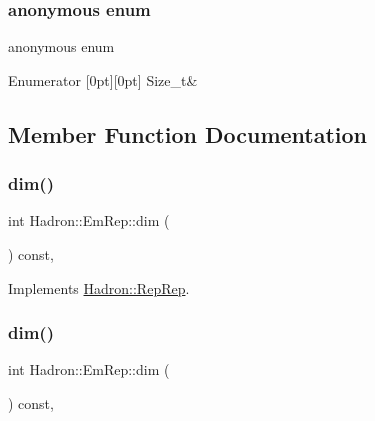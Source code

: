 \subsubsection{\texorpdfstring{anonymous enum}{anonymous enum}}
{\footnotesize\ttfamily anonymous enum}

\begin{DoxyEnumFields}{Enumerator}
[0pt][0pt]{}\mbox{\label{structHadron_1_1EmRep_a22e88e79dedc5fc8a9a51193c073ccfca623644658daf44b84d24cef484208987}} 
Size\+\_\+t&\\
\hline

\end{DoxyEnumFields}


\subsection{Member Function Documentation}
\mbox{\label{structHadron_1_1EmRep_a446425f715385b4b8ac879d3ffec864f}} 
\subsubsection{\texorpdfstring{dim()}{dim()}\hspace{0.1cm}{\footnotesize\ttfamily [1/5]}}
{\footnotesize\ttfamily int Hadron\+::\+Em\+Rep\+::dim (\begin{DoxyParamCaption}{ }\end{DoxyParamCaption}) const\hspace{0.3cm}{\ttfamily [inline]}, {\ttfamily [virtual]}}



Implements \mbox{\hyperlink{structHadron_1_1RepRep_a92c8802e5ed7afd7da43ccfd5b7cd92b}{Hadron\+::\+Rep\+Rep}}.

\mbox{\label{structHadron_1_1EmRep_a446425f715385b4b8ac879d3ffec864f}} 
\subsubsection{\texorpdfstring{dim()}{dim()}\hspace{0.1cm}{\footnotesize\ttfamily [2/5]}}
{\footnotesize\ttfamily int Hadron\+::\+Em\+Rep\+::dim (\begin{DoxyParamCaption}{ }\end{DoxyParamCaption}) const\hspace{0.3cm}{\ttfamily [inline]}, {\ttfamily [virtual]}}



